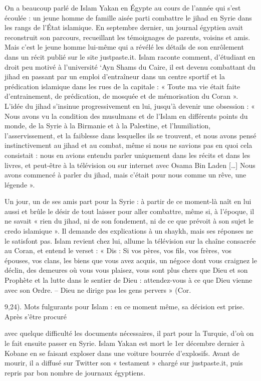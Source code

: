 On a beaucoup parlé de Islam Yakan en Égypte au cours de l'année qui
s'est écoulée : un jeune homme de famille aisée parti combattre le jihad
en Syrie dans les rangs de l'État islamique. En septembre dernier, un
journal égyptien avait reconstruit son parcours, recueillant les
témoignages de parents, voisins et amis. Mais c'est le jeune homme
lui-même qui a révélé les détails de son enrôlement dans un récit publié
sur le site justpaste.it. Islam raconte comment, d'étudiant en droit peu
motivé à l'université `Ayn Shams du Caire, il est devenu combattant du
jihad en passant par un emploi d'entraîneur dans un centre sportif et la
prédication islamique dans les rues de la capitale : « Toute ma vie
était faite d'entrainement, de prédication, de mosquée et de
mémorisation du Coran ». L'idée du jihad s'insinue progressivement en
lui, jusqu'à devenir une obsession : « Nous avons vu la condition des
musulmans et de l'Islam en différents points du monde, de la Syrie à la
Birmanie et à la Palestine, et l'humiliation, l'asservissement, et la
faiblesse dans lesquelles ils se trouvent, et nous avons pensé
instinctivement au jihad et au combat, même si nous ne savions pas en
quoi cela consistait : nous en avions entendu parler uniquement dans les
récits et dans les livres, et peut-être à la télévision ou sur internet
avec Osama Bin Laden {[}\ldots{]} Nous avons commencé à parler du jihad,
mais c'était pour nous comme un rêve, une légende ».

Un jour, un de ses amis part pour la Syrie : à partir de ce moment-là
naît en lui aussi et brûle le désir de tout laisser pour aller
combattre, même si, à l'époque, il ne savait « rien du jihad, ni de son
fondement, ni de ce que prévoit à son sujet le credo islamique ». Il
demande des explications à un shaykh, mais ses réponses ne le satisfont
pas. Islam revient chez lui, allume la télévision sur la chaîne
consacrée au Coran, et entend le verset : « Dis : Si vos pères, vos
fils, vos frères, vos épouses, vos clans, les biens que vous avez
acquis, un négoce dont vous craignez le déclin, des demeures où vous
vous plaisez, vous sont plus chers que Dieu et son Prophète et la lutte
dans le sentier de Dieu : attendez-vous à ce que Dieu vienne avec son
Ordre. -- Dieu ne dirige pas les gens pervers » (Cor.

9,24). Mots fulgurants pour Islam : en ce moment même, sa décision est
prise. Après s'être procuré

avec quelque difficulté les documents nécessaires, il part pour la
Turquie, d'où on le fait ensuite passer en Syrie. Islam Yakan est mort
le 1er décembre dernier à Kobane en se faisant exploser dans une voiture
bourrée d'explosifs. Avant de mourir, il a diffusé sur Twitter son «
testament » chargé sur justpaste.it, puis repris par bon nombre de
journaux égyptiens.

